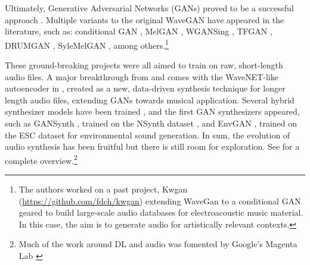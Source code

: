 \documentclass[a4paper,10pt,oneside]{article}
\begin{document}
\begin{sloppy}
Ultimately, Generative Adversarial Networks (GANs) proved to be a successful approach \cite{Bollepalli_2017, 2017Kaneko, pascual2017segan, 2019waveglow, tian2020tfgan, Liu_2020}. Multiple variants to the original WaveGAN \cite{donahue2018adversarial} have appeared in the literature, such as: conditional GAN \cite{2018Lee}, MelGAN \cite{NEURIPS2019_6804c9bc, jang2021universal}, WGANSing \cite{Chandna_2019}, TFGAN \cite{tian2020tfgan}, DRUMGAN \cite{javier_nistal_2020_4245504}, SyleMelGAN \cite{mustafa2021stylemelgan}, among others.\footnote{The authors worked on a past project, Kwgan (\url{https://github.com/fdch/kwgan}) extending WaveGan to a conditional GAN geared to build large-scale audio databases for electroacoustic music material. In this case, the aim is to generate audio for artistically relevant contexts.} 

These ground-breaking projects were all aimed to train on raw, short-length audio files. A major breakthrough from \cite{oord2016wavenet} and \cite{mehri2017samplernn} comes with the WaveNET-like autoencoder in \cite{engel2017neural}, created as a new, data-driven synthesis technique for longer length audio files, extending GANs towards musical application. Several hybrid synthesizer models have been trained \cite{mccarthy2020hooligan}, and the first GAN synthesizers appeared, such as GANSynth \cite{engel2019gansynth}, trained on the NSynth dataset \cite{engel2017neural}, and EnvGAN \cite{madhu2021envgan}, trained on the ESC dataset \cite{2015piczak} for environmental sound generation. In sum, the evolution of audio synthesis has been fruitful but there is still room for exploration. See \cite{2019Purwins} for a complete overview.\footnote{Much of the work around DL and audio was fomented by Google's Magenta Lab \cite{adam_roberts_2019_4285266}} 


\end{sloppy}
\end{document}
